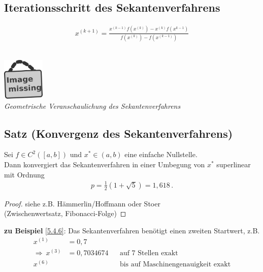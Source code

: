 \documentclass[ngerman,fontsize=11pt, paper=a4, parskip=half, titlepage=true, toc=bib]{scrbook}
\newcommand{\imagemissing}[1]{
  \begin{center}~\\
    \centering 
    \includegraphics[width=2cm]{images/image_missing.jpg}\\
    \textit{#1} \\
  \end{center}
}
\begin{document}
  
  \subsection{Iterationsschritt des Sekantenverfahrens}
  \begin{gather}
    x^{(k+1)} = \frac{x^{(k-1)}f(x^{(k)}) - x^{(k)}f(x^{k-1})}{f(x^{(k)})-f(x^{(k-1)})}
  \end{gather}
  
  \imagemissing{Geometrische Veranschaulichung des Sekantenverfahrens}
  
  
  \subsection{Satz (Konvergenz des Sekantenverfahrens)}
  Sei $f\in C^2([a,b])$ und $x^{*}\in (a,b)$ eine einfache Nullstelle.\\
  Dann konvergiert das Sekantenverfahren in einer Umbegung von $x^{*}$
  superlinear mit Ordnung 
  \begin{gather*}
    p=\frac{1}{2}(1+\sqrt{5})= 1,618 \, .
  \end{gather*}
  
  \begin{proof}
    siehe z.B. Hämmerlin/Hoffmann\cite{haemmerlinhoffmann}
    oder Stoer\cite{stoerbulirsch}\\
    (Zwischenwertsatz, Fibonacci-Folge)
  \end{proof}
  
  \textbf{zu Beispiel} \ref{5.4.6}: Das Sekantenverfahren benötigt
  einen zweiten Startwert, z.B.
  \begin{align*}
    x^{(1)}&=0,7 \\
    \Rightarrow ~ x^{(3)} &= 0,7034674 
                          &&\text{auf 7 Stellen exakt}\\
    x^{(6)} &&& \text{bis auf Maschinengenauigkeit exakt}
  \end{align*}
  
  
\end{document}
